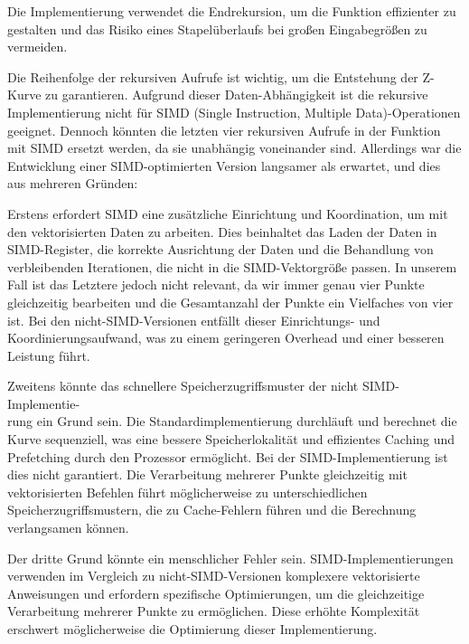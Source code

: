 \documentclass[course=erap]{aspdoc}
\begin{document}
\noindent Die Implementierung verwendet die Endrekursion, um die Funktion effizienter zu gestalten und das Risiko eines Stapelüberlaufs bei großen Eingabegrößen zu vermeiden.
\setlength{\parskip}{1em}

\noindent Die Reihenfolge der rekursiven Aufrufe ist wichtig, um die Entstehung der Z-Kurve zu garantieren. Aufgrund dieser Daten-Abhängigkeit ist die rekursive Implementierung nicht für SIMD (Single Instruction, Multiple Data)-Operationen geeignet. Dennoch könnten die letzten vier rekursiven Aufrufe in der Funktion mit SIMD ersetzt werden, da sie unabhängig voneinander sind. Allerdings war die Entwicklung einer SIMD-optimierten Version langsamer als erwartet, und dies aus mehreren Gründen:
\setlength{\parskip}{1em}

\noindent Erstens erfordert SIMD eine zusätzliche Einrichtung und Koordination, um mit den vektorisierten Daten zu arbeiten. Dies beinhaltet das Laden der Daten in SIMD-Register, die korrekte Ausrichtung der Daten und die Behandlung von verbleibenden Iterationen, die nicht in die SIMD-Vektorgröße passen. In unserem Fall ist das Letztere jedoch nicht relevant, da wir immer genau vier Punkte gleichzeitig bearbeiten und die Gesamtanzahl der Punkte ein Vielfaches von vier ist. Bei den nicht-SIMD-Versionen entfällt dieser Einrichtungs- und Koordinierungsaufwand, was zu einem geringeren Overhead und einer besseren Leistung führt.
\setlength{\parskip}{1em}

\noindent Zweitens könnte das schnellere Speicherzugriffsmuster der nicht SIMD-Implementie-\\rung ein Grund sein. Die Standardimplementierung durchläuft und berechnet die Kurve sequenziell, was eine bessere Speicherlokalität und effizientes Caching und Prefetching durch den Prozessor ermöglicht. Bei der SIMD-Implementierung ist dies nicht garantiert. Die Verarbeitung mehrerer Punkte gleichzeitig mit vektorisierten Befehlen führt möglicherweise zu unterschiedlichen Speicherzugriffsmustern, die zu Cache-Fehlern führen und die Berechnung verlangsamen können.

\setlength{\parskip}{1em}

\noindent Der dritte Grund könnte ein menschlicher Fehler sein. SIMD-Implementierungen verwenden im Vergleich zu nicht-SIMD-Versionen komplexere vektorisierte Anweisungen und erfordern spezifische Optimierungen, um die gleichzeitige Verarbeitung mehrerer Punkte zu ermöglichen. Diese erhöhte Komplexität erschwert möglicherweise die Optimierung dieser Implementierung.
\setlength{\parskip}{1em}
\end{document}
